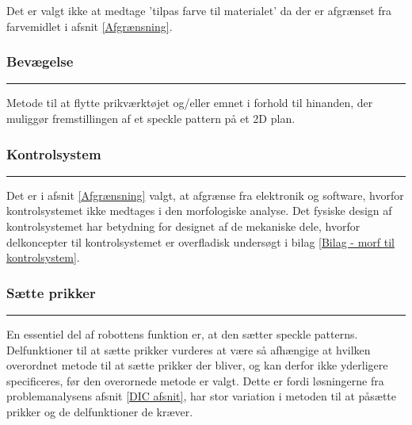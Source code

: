 Det er valgt ikke at medtage 'tilpas farve til materialet' da der er afgrænset fra farvemidlet i afsnit \ref{Afgrænsning}.


\subsubsection{Bevægelse} \plainbreak{-0.5}
Metode til at flytte prikværktøjet og/eller emnet i forhold til hinanden, der muliggør fremstillingen af et speckle pattern på et 2D plan.



\subsubsection{Kontrolsystem}\plainbreak{-0.5}

Det er i afsnit \ref{Afgrænsning} valgt, at afgrænse fra elektronik og software, hvorfor kontrolsystemet ikke medtages i den morfologiske analyse. Det fysiske design af kontrolsystemet har betydning for designet af de mekaniske dele, hvorfor delkoncepter til kontrolsystemet er overfladisk undersøgt i bilag \ref{Bilag - morf til kontrolsystem}.



\subsubsection{Sætte prikker} \plainbreak{-0.5}
En essentiel del af robottens funktion er, at den sætter speckle patterns. Delfunktioner til at sætte prikker vurderes at være så afhængige at hvilken overordnet metode til at sætte prikker der bliver, og kan derfor ikke yderligere specificeres, før den overornede metode er valgt. Dette er fordi løsningerne fra problemanalysens afsnit \ref{DIC afsnit}, har stor variation i metoden til at påsætte prikker og de delfunktioner de kræver. 




